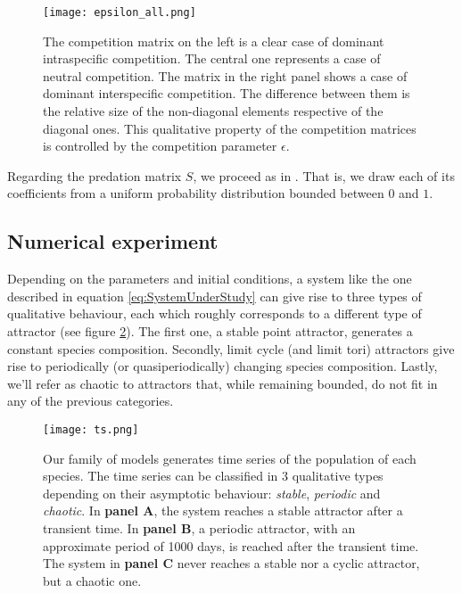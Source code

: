 \begin{figure}[H]
	\begin{center}
		\texttt{[image: epsilon\_all.png]}
	\end{center}
	\caption{The competition matrix on the left is a clear case of dominant intraspecific competition. The central one represents a case of neutral competition. The matrix in the right panel shows a case of dominant interspecific competition. The difference between them is the relative size of the non-diagonal elements respective of the diagonal ones. This qualitative property of the competition matrices is controlled by the competition parameter $\epsilon$.}
	\label{fig:CompetitionParameter}
\end{figure}

Regarding the predation matrix $S$, we proceed as in \citet{Dakos2009b}. That is, we draw each of its coefficients from a uniform probability distribution bounded between $0$ and $1$.

\subsection{Numerical experiment}
\label{subsec:NumericalExperiment}

Depending on the parameters and initial conditions, a system like the one described in equation \ref{eq:SystemUnderStudy} can give rise to three types of qualitative behaviour, each which roughly corresponds to a different type of attractor (see figure \ref{fig:TimeSeries}). The first one, a stable point attractor, generates a constant species composition. Secondly, limit cycle (and limit tori) attractors give rise to periodically (or quasiperiodically) changing species composition. Lastly, we'll refer as chaotic to attractors that, while remaining bounded, do not fit in any of the previous categories.

\begin{figure}
	\begin{center}
		\texttt{[image: ts.png]}
	\end{center}
	\caption{Our family of models generates time series of the population of each species. The time series can be classified in $3$ qualitative types depending on their asymptotic behaviour: \textit{stable}, \textit{periodic} and \textit{chaotic}. In \textbf{panel A}, the system reaches a stable attractor after a transient time. In \textbf{panel B}, a periodic attractor, with an approximate period of 1000 days, is reached after the transient time. The system in \textbf{panel C} never reaches a stable nor a cyclic attractor, but a chaotic one.}
	\label{fig:TimeSeries}
\end{figure}

